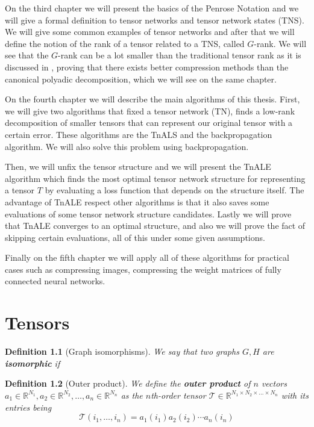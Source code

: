 \documentclass[11pt,a4paper,openright,oneside]{book}
\numberwithin{equation}{section}
\newtheorem{defn0}{Definition}[chapter]
\newenvironment{definition}{ \begin{defn0}}{\end{defn0}}
\begin{document}
On the third chapter we will present the basics of the Penrose Notation and we will give a formal
definition to tensor networks and tensor network states (\gls{TNS}). We will give some
common examples of tensor networks and after that we will define the notion
of the rank of a tensor related to a TNS, called $G$-rank. We will see that the $G$-rank can be a lot smaller
than the traditional tensor rank as it is discussed in \cite{yeTensorNetworkRanks2019},
proving that there exists better compression methods than the canonical
polyadic decomposition, which we will see on the same chapter.

On the fourth chapter we will describe the main algorithms of this thesis. First, we will give two algorithms
that fixed a tensor network (\gls{TN}), finds a low-rank decomposition of smaller tensors that can represent our original tensor
with a certain error. These algorithms are the \gls{TnALS} and the backpropagation algorithm.
We will also solve this problem using backpropagation.

Then, we will unfix the tensor structure and we will present the \gls{TnALE} algorithm which finds the most optimal
tensor network structure for representing a tensor $T$ by evaluating a loss function that depends on the
structure itself. The advantage of TnALE respect other algorithms
is that it also saves some evaluations of some tensor network structure candidates. Lastly we will prove
that \gls{TnALE} converges to an optimal structure, and also we will prove the fact of
skipping certain evaluations, all of this under some given assumptions.

Finally on the fifth chapter we will apply all of these algorithms for practical cases such as compressing images,
compressing the weight matrices of fully connected neural networks.

\chapter{Tensors}


\iffalse
\begin{definition}[Graph isomorphisms]
    We say that two graphs $G, H$ are \textbf{isomorphic} if 
\end{definition}


\begin{definition}[Outer product]
    We define the \textbf{outer product} of $n$ vectors 
    $a_1 \in \mathbb{R}^{N_1}, a_2 \in \mathbb{R}^{N_2}, \dots, a_n \in \mathbb{R}^{N_n}$
    as the $n$th-order tensor $\mathcal{T} \in \mathbb{R}^{N_1 \times N_2 \times \dots \times N_n}$ with its entries being
    $$\mathcal{T}(i_1, \dots, i_n) = a_1(i_1) a_2(i_2) \cdots a_n(i_n)$$
\end{definition}
\end{document}

